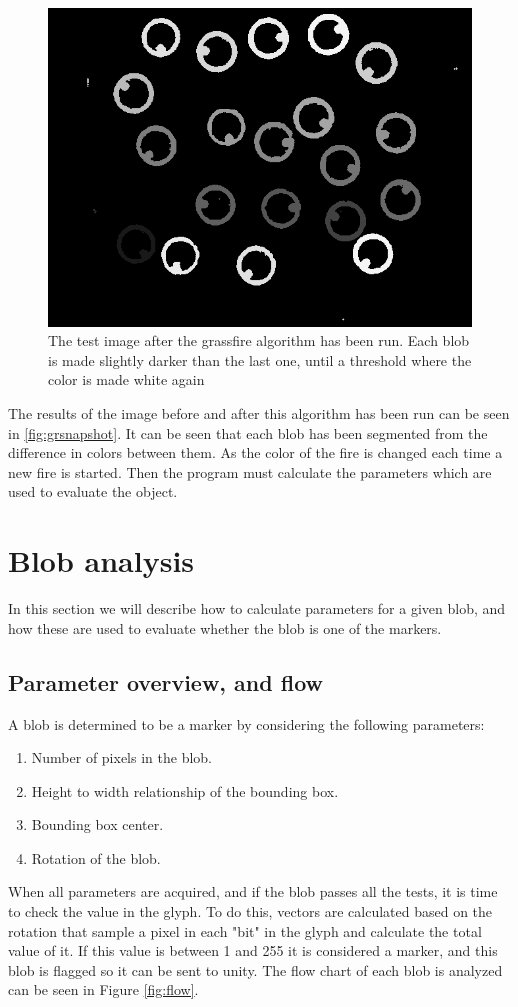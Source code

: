 \begin{figure}[H]
	\centering
	\includegraphics[width=0.6\linewidth]{figure/Analysis/grassfire.png}
	\caption{The test image after the grassfire algorithm has been run. Each blob is made slightly darker than the last one, until a threshold where the color is made white again}
	\label{fig:grsnapshot}
\end{figure} 
The results of the image before and after this algorithm has been run can be seen in \autoref{fig:grsnapshot}. It can be seen that each blob has been segmented from the difference in colors between them. As the color of the fire is changed each time a new fire is started. Then the program must calculate the parameters which are used to evaluate the object.
\section{Blob analysis}
In this section we will describe how to calculate parameters for a given blob, and how these are used to evaluate whether the blob is one of the markers.
\subsection{Parameter overview, and flow}
A blob is determined to be a marker by considering the following parameters:
\begin{enumerate}
	\item Number of pixels in the blob.
	\item Height to width relationship of the bounding box.
	\item Bounding box center.
	\item Rotation of the blob.
\end{enumerate}
When all parameters are acquired, and if the blob passes all the tests, it is time to check the value in the glyph. To do this, vectors are calculated based on the rotation that sample a pixel in each "bit" in the glyph and calculate the total value of it. If this value is between 1 and 255 it is considered a marker, and this blob is flagged so it can be sent to unity. The flow chart of each blob is analyzed can be seen in Figure \ref{fig:flow}.

